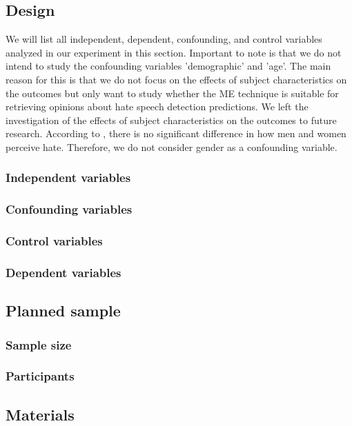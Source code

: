 \subsection{Design}
We will list all independent, dependent, confounding, and control variables analyzed in our experiment in this section.
%
Important to note is that we do not intend to study the confounding variables 'demographic' and 'age'.
%
The main reason for this is that we do not focus on the effects of subject characteristics on the outcomes but only want to study whether the ME technique is suitable for retrieving opinions about hate speech detection predictions. We left the investigation of the effects of subject characteristics on the outcomes to future research. According to \cite{gold2018women}, there is no significant difference in how men and women perceive hate. Therefore, we do not consider gender as a confounding variable.

\subsubsection{Independent variables}


\subsubsection{Confounding variables}
\subsubsection{Control variables}
\subsubsection{Dependent variables}

\subsection{Planned sample}
\subsubsection{Sample size}

\subsubsection{Participants}

\subsection{Materials}
